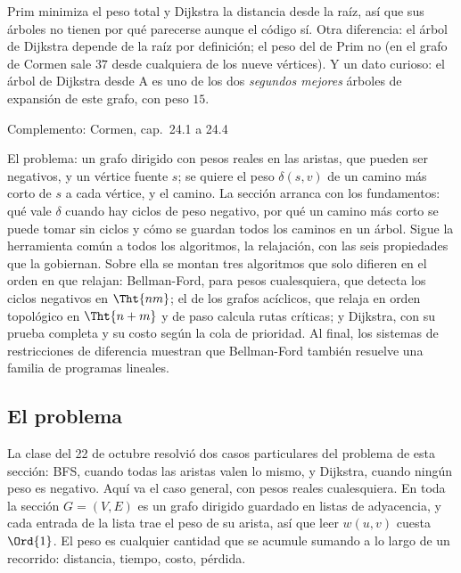 \documentclass[11pt,letterpaper]{article}
\begin{document}
Prim minimiza el peso total y Dijkstra la distancia desde la raíz, así
que sus árboles no tienen por qué parecerse aunque el código sí. Otra
diferencia: el árbol de Dijkstra depende de la raíz por definición; el
peso del de Prim no (en el grafo de Cormen sale $37$ desde cualquiera
de los nueve vértices). Y un dato curioso: el árbol de Dijkstra desde A
es uno de los dos \emph{segundos mejores} árboles de expansión de este
grafo, con peso $15$.

\newpage


  {Complemento: Cormen, cap.\ 24.1 a 24.4}
\label{sec:caminos-fuente}

\begin{quick_sum}
  El problema: un grafo dirigido con pesos reales en las aristas, que
  pueden ser negativos, y un vértice fuente $s$; se quiere el peso
  $\delta(s, v)$ de un camino más corto de $s$ a cada vértice, y el
  camino. La sección arranca con los fundamentos: qué vale $\delta$
  cuando hay ciclos de peso negativo, por qué un camino más corto se
  puede tomar sin ciclos y cómo se guardan todos los caminos en un
  árbol. Sigue la herramienta común a todos los algoritmos, la
  relajación, con las seis propiedades que la gobiernan. Sobre ella se
  montan tres algoritmos que solo difieren en el orden en que relajan:
  Bellman-Ford, para pesos cualesquiera, que detecta los ciclos
  negativos en $\Tht{nm}$; el de los grafos acíclicos, que relaja en
  orden topológico en $\Tht{n + m}$ y de paso calcula rutas críticas;
  y Dijkstra, con su prueba completa y su costo según la cola de
  prioridad. Al final, los sistemas de restricciones de diferencia
  muestran que Bellman-Ford también resuelve una familia de programas
  lineales.
\end{quick_sum}


\subsection*{El problema}

La clase del 22 de octubre resolvió dos casos particulares del
problema de esta sección: BFS, cuando todas las aristas valen lo
mismo, y Dijkstra, cuando ningún peso es negativo. Aquí va el caso
general, con pesos reales cualesquiera. En toda la sección
$G = (V, E)$ es un grafo dirigido guardado en listas de adyacencia, y
cada entrada de la lista trae el peso de su arista, así que leer
$w(u, v)$ cuesta $\Ord{1}$. El peso es cualquier cantidad que se
acumule sumando a lo largo de un recorrido: distancia, tiempo, costo,
pérdida.
\end{document}
